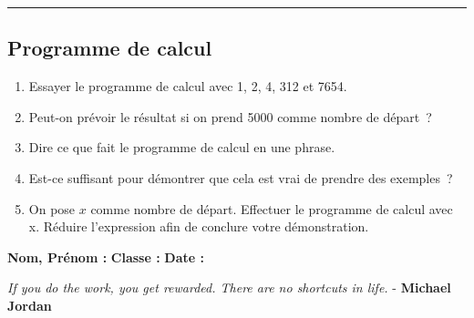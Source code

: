 \documentclass[11pt]{article}
\newcommand{\horrule}[1]{\rule{\linewidth}{#1}} %
\begin{document}
\vspace{-0.4cm}
\horrule{1px}
\vspace{-0.8cm}

\subsection*{Programme de calcul}

\begin{enumerate}
  \item Essayer le programme de calcul avec 1, 2, 4, 312 et 7654.
  \item Peut-on prévoir le résultat si on prend 5000 comme nombre de départ ?
  \item Dire ce que fait le programme de calcul en une phrase.
  \item Est-ce suffisant pour démontrer que cela est vrai de prendre des exemples ?
  \item On pose $x$ comme nombre de départ. Effectuer le programme de calcul avec x. Réduire l’expression afin de conclure votre démonstration.
\end{enumerate}

\newpage

\textbf{Nom, Prénom :} \hspace{8cm} \textbf{Classe :} \hspace{3cm} \textbf{Date :}\\
\vspace{-0.8cm}
\begin{center}
  \textit{If you do the work, you get rewarded. There are no shortcuts in life.}  - \textbf{Michael Jordan}
\end{center}
\vspace{-0.8cm}
\end{document}
